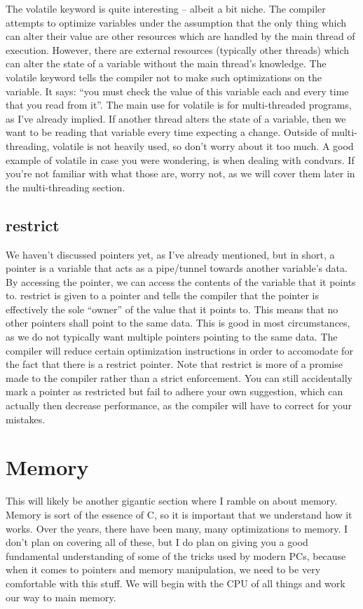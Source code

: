 \documentclass{article}
\begin{document}
The volatile keyword is quite interesting – albeit a bit niche. The compiler attempts to optimize variables
under the assumption that the only thing which can alter their value are other resources which are handled by
the main thread of execution. However, there are external resources (typically other threads) which can alter
the state of a variable without the main thread’s knowledge. The volatile keyword tells the compiler not to
make such optimizations on the variable. It says: “you must check the value of this variable each and every
time that you read from it”. The main use for volatile is for multi-threaded programs, as I’ve already
implied. If another thread alters the state of a variable, then we want to be reading that variable every
time expecting a change. Outside of multi-threading, volatile is not heavily used, so don’t worry about it
too much. A good example of volatile in case you were wondering, is when dealing with condvars. If you’re not
familiar with what those are, worry not, as we will cover them later in the multi-threading section.

\subsection{restrict}

We haven’t discussed pointers yet, as I’ve already mentioned, but in short, a pointer is a variable that acts
as a pipe/tunnel towards another variable’s data. By accessing the pointer, we can access the contents of the
variable that it points to. restrict is given to a pointer and tells the compiler that the pointer is
effectively the sole “owner” of the value that it points to. This means that no other pointers shall point to
the same data. This is good in most circumstances, as we do not typically want multiple pointers pointing to
the same data. The compiler will reduce certain optimization instructions in order to accomodate for the fact
that there is a restrict pointer. Note that restrict is more of a promise made to the compiler rather than a
strict enforcement. You can still accidentally mark a pointer as restricted but fail to adhere your own
suggestion, which can actually then decrease performance, as the compiler will have to correct for your
mistakes.

\section{Memory}

This will likely be another gigantic section where I ramble on about memory. Memory is sort of the essence of
C, so it is important that we understand how it works. Over the years, there have been many, many
optimizations to memory. I don’t plan on covering all of these, but I do plan on giving you a good
fundamental understanding of some of the tricks used by modern PCs, because when it comes to pointers and
memory manipulation, we need to be very comfortable with this stuff. We will begin with the CPU of all things
and work our way to main memory.
\end{document}
